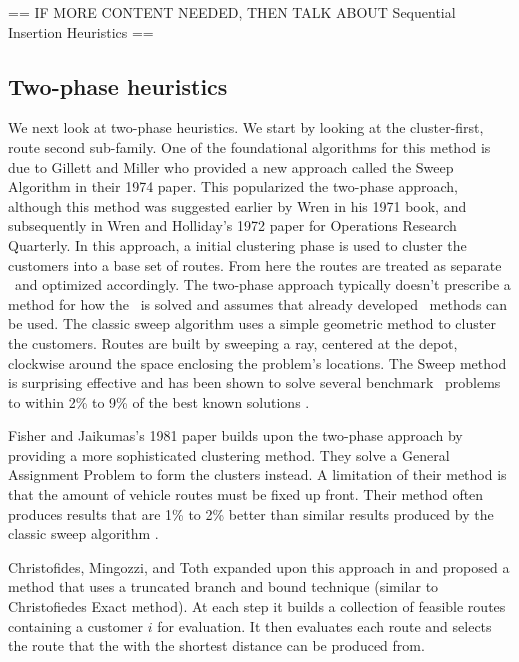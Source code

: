== IF MORE CONTENT NEEDED, THEN TALK ABOUT Sequential Insertion Heuristics ==


\subsection{Two-phase heuristics}
\label{sec:tph}

We next look at two-phase heuristics. We start by looking at the cluster-first, route second sub-family. One of the foundational algorithms for this method is due to Gillett and Miller who provided a new approach called the Sweep Algorithm in their 1974 paper\cite{GM:1974}. This popularized the two-phase approach, although this method was suggested earlier by Wren in his 1971 book, and subsequently in Wren and Holliday's 1972 paper for Operations Research Quarterly. In this approach, a initial clustering phase is used to cluster the customers into a base set of routes. From here the routes are treated as separate \TSP\ and optimized accordingly. The two-phase approach typically doesn't prescribe a method for how the \TSP\ is solved and assumes that already developed \TSP\ methods can be used. The classic sweep algorithm uses a simple geometric method to cluster the customers. Routes are built by sweeping a ray, centered at the depot, clockwise around the space enclosing the problem's locations. The Sweep method is surprising effective and has been shown to solve several benchmark \VRP\ problems to within 2\% to 9\% of the best known solutions \cite{TV2001}.


Fisher and Jaikumas's 1981 paper builds upon the two-phase approach by providing a more sophisticated clustering method. They solve a General Assignment Problem to form the clusters instead. A limitation of their method is that the amount of vehicle routes must be fixed up front. Their method often produces results that are 1\% to 2\% better than similar results produced by the classic sweep algorithm \cite{TV2001}. 

Christofides, Mingozzi, and Toth expanded upon this approach in \cite{???} and proposed a method that uses a truncated branch and bound technique (similar to Christofiedes Exact method). At each step it builds a collection of feasible routes containing a customer $i$ for evaluation. It then evaluates each route and selects the route that the \TSP with the shortest distance can be produced from.

